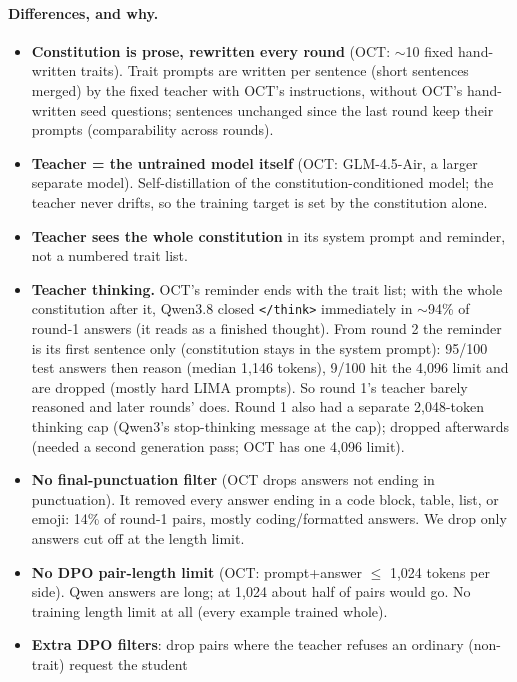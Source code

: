 \paragraph{Differences, and why.}
\begin{itemize}
  \item \textbf{Constitution is prose, rewritten every round} (OCT: $\sim$10 fixed hand-written traits). Trait prompts
        are written per sentence (short sentences merged) by the fixed teacher with OCT's instructions,
        without OCT's hand-written seed questions; sentences unchanged since the last round keep their prompts
        (comparability across rounds).
  \item \textbf{Teacher = the untrained model itself} (OCT: GLM-4.5-Air, a larger separate model). Self-distillation
        of the constitution-conditioned model; the teacher never drifts, so the training target is set by the
        constitution alone.
  \item \textbf{Teacher sees the whole constitution} in its system prompt and reminder, not a numbered trait list.
  \item \textbf{Teacher thinking.} OCT's reminder ends with the trait list; with the whole constitution after it,
        Qwen3.8 closed \texttt{</think>} immediately in $\sim$94\% of round-1 answers (it reads as a finished
        thought). From round 2 the reminder is its first sentence only (constitution stays in the system prompt):
        95/100 test answers then reason (median 1,146 tokens), 9/100 hit the 4,096 limit and are dropped (mostly hard
        LIMA prompts). So round 1's teacher barely reasoned and later rounds' does. Round 1 also had a separate
        2,048-token thinking cap (Qwen3's stop-thinking message at the cap); dropped afterwards (needed a second
        generation pass; OCT has one 4,096 limit).
  \item \textbf{No final-punctuation filter} (OCT drops answers not ending in punctuation). It removed every answer
        ending in a code block, table, list, or emoji: 14\% of round-1 pairs, mostly coding/formatted answers.
        We drop only answers cut off at the length limit.
  \item \textbf{No DPO pair-length limit} (OCT: prompt+answer $\le$ 1,024 tokens per side). Qwen answers are long;
        at 1,024 about half of pairs would go. No training length limit at all (every example trained whole).
  \item \textbf{Extra DPO filters}: drop pairs where the teacher refuses an ordinary (non-trait) request the student

\end{itemize}
